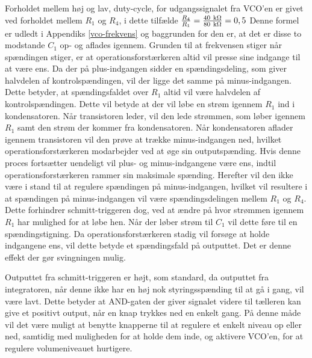 Forholdet mellem høj og lav, duty-cycle, for udgangssignalet fra VCO'en er givet ved forholdet mellem $R_1$ og $R_4$, i dette tilfælde $\frac{R_4}{R_1} = \frac{40~\mathrm{k}\ohm}{80~\mathrm{k}\ohm}=0,5$ Denne formel er udledt i Appendiks \ref{vco-frekvens} og baggrunden for den er, at det er disse to modstande $C_1$ op- og aflades igennem. Grunden til at frekvensen stiger når spændingen stiger, er at operationsforstærkeren altid vil presse sine indgange til at være ens. Da der på plus-indgangen sidder en spændingsdeling, som giver halvdelen af kontrolspændingen, vil der ligge det samme på minus-indgangen. Dette betyder, at spændingsfaldet over $R_1$ altid vil være halvdelen af kontrolspændingen. Dette vil betyde at der vil løbe en strøm igennem $R_1$ ind i kondensatoren. Når transistoren leder, vil den lede strømmen, som løber igennem $R_1$ samt den strøm der kommer fra kondensatoren. Når kondensatoren aflader igennem transistoren vil den prøve at trække minus-indgangen ned, hvilket operationsforstærkeren modarbejder ved at øge sin outputspænding. Hvis denne proces fortsætter uendeligt vil plus- og minus-indgangene være ens, indtil operationsforstærkeren rammer sin maksimale spænding. Herefter vil den ikke være i stand til at regulere spændingen på minus-indgangen, hvilket vil resultere i at spændingen på minus-indgangen vil være spændingsdelingen mellem $R_1$ og $R_4$. Dette forhindrer schmitt-triggeren dog, ved at ændre på hvor strømmen igennem $R_1$ har mulighed for at løbe hen. Når der løber strøm til $C_1$ vil dette føre til en spændingstigning. Da operationsforstærkeren stadig vil forsøge at holde indgangene ens, vil dette betyde et spændingsfald på outputtet. Det er denne effekt der gør svingningen mulig.

Outputtet fra schmitt-triggeren er højt, som standard, da outputtet fra integratoren, når denne ikke har en høj nok styringsspænding til at gå i gang, vil være lavt. Dette betyder at AND-gaten der giver signalet videre til tælleren kan give et positivt output, når en knap trykkes ned en enkelt gang. På denne måde vil det være muligt at benytte knapperne til at regulere et enkelt niveau op eller ned, samtidig med muligheden for at holde dem inde, og aktivere VCO'en, for at regulere volumeniveauet hurtigere.




